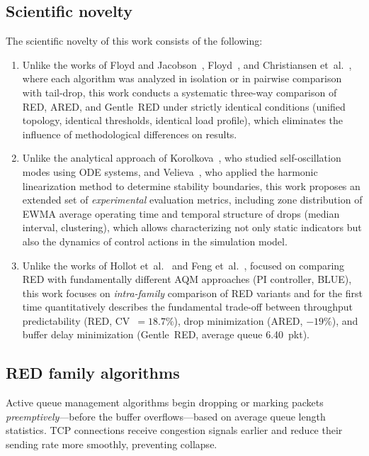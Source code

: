\documentclass[default]{subfiles}
\begin{document}
{\subsection{Scientific novelty}

The scientific novelty of this work consists of the following:
\begin{enumerate}
  \item Unlike the works of Floyd and Jacobson~\cite{floyd1993}, Floyd~\cite{floyd2000, floyd2001}, and Christiansen et~al.~\cite{christiansen2001}, where each algorithm was analyzed in isolation or in pairwise comparison with tail-drop, this work conducts a systematic three-way comparison of RED, ARED, and Gentle~RED under strictly identical conditions (unified topology, identical thresholds, identical load profile), which eliminates the influence of methodological differences on results.
  \item Unlike the analytical approach of Korolkova~\cite{korolkova2010}, who studied self-oscillation modes using ODE systems, and Velieva~\cite{velieva2019}, who applied the harmonic linearization method to determine stability boundaries, this work proposes an extended set of \textit{experimental} evaluation metrics, including zone distribution of EWMA average operating time and temporal structure of drops (median interval, clustering), which allows characterizing not only static indicators but also the dynamics of control actions in the simulation model.
  \item Unlike the works of Hollot et~al.~\cite{hollot2001} and Feng et~al.~\cite{feng2002}, focused on comparing RED with fundamentally different AQM approaches (PI controller, BLUE), this work focuses on \textit{intra-family} comparison of RED variants and for the first time quantitatively describes the fundamental trade-off between throughput predictability (RED, CV~$= 18.7\%$), drop minimization (ARED, $-19\%$), and buffer delay minimization (Gentle~RED, average queue 6.40~pkt).
\end{enumerate}

\subsection{RED family algorithms}

Active queue management algorithms begin dropping or marking packets \textit{preemptively}---before the buffer overflows---based on average queue length statistics. TCP connections receive congestion signals earlier and reduce their sending rate more smoothly, preventing collapse.

}
\end{document}
